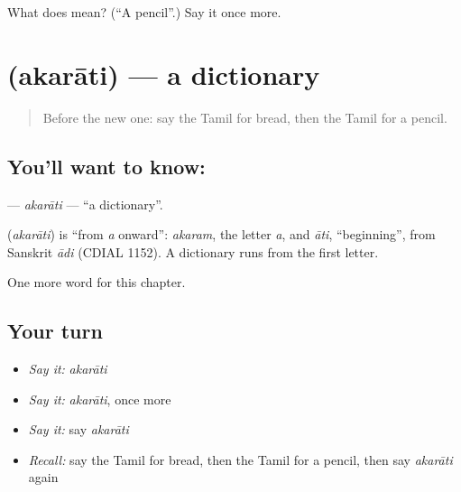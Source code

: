 \begin{tcolorbox}[breakable,colback=teal!4,colframe=teal!35!black,title={Before you move on}]
What does  mean? (\textquotedblleft{}A pencil\textquotedblright{}.) Say it once more.
\end{tcolorbox}
\section[\texorpdfstring{\ta{அகராதி} (akarāti)}{அகராதி (akarāti)}]{ (akarāti) — a dictionary}

\label{lesson:TA-C215-akarati}



\begin{quote}
Before the new one: say the Tamil for bread, then the Tamil for a pencil.
\end{quote}

\subsection*{You'll want to know: }
\textbf{} — \emph{akarāti} — \textquotedblleft{}a dictionary\textquotedblright{}.

\begin{cousinweb}
\textbf{} (\emph{akarāti}) is \textquotedblleft{}from \emph{a} onward\textquotedblright{}: \emph{akaram}, the letter \emph{a}, and \emph{āti}, \textquotedblleft{}beginning\textquotedblright{}, from Sanskrit \emph{ādi} (CDIAL 1152). A dictionary runs from the first letter.
\end{cousinweb}

\begin{grammarlens}[title={What you've built}]
One more word for this chapter.
\end{grammarlens}

\subsection*{Your turn}
\begin{itemize}
\raggedright
  \item \emph{Say it:} \emph{akarāti}
  \item \emph{Say it:} \emph{akarāti}, once more
  \item \emph{Say it:} say \emph{akarāti}
  \item \emph{Recall:} say the Tamil for bread, then the Tamil for a pencil, then say \emph{akarāti} again
\end{itemize}

